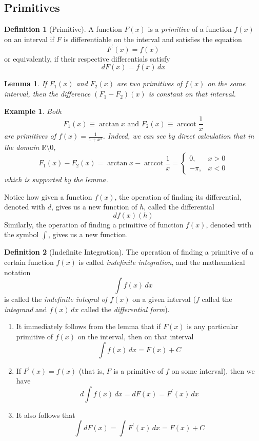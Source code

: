 \documentclass{article}
\DeclareMathOperator{\arccot}{arccot}
\newtheorem{lemma}[theorem]{Lemma}
\newtheorem{example}{Example}[section]
\theoremstyle{remark}
\theoremstyle{definition}
\newtheorem{definition}{Definition}[section]
\begin{document}
\subsection{Primitives}
\begin{definition}[Primitive]
A function $F(x)$ is a \textit{primitive} of a function $f(x)$ on an interval if $F$ is differentiable on the interval and satisfies the equation 
\[F^\prime (x) = f(x)\]
or equivalently, if their respective differentials satisfy
\[d F(x) = f(x) \,dx\]
\end{definition}

\begin{lemma}
If $F_1(x)$ and $F_2 (x)$ are two primitives of $f(x)$ on the same interval, then the difference $(F_1 - F_2)(x)$ is constant on that interval. 
\end{lemma}

\begin{example}
Both 
\[F_1(x) \equiv \arctan{x} \text{ and } F_2(x) \equiv \arccot{\frac{1}{x}}\]
are primitives of $f(x) = \frac{1}{1 + x^2}$. Indeed, we can see by direct calculation that in the domain $\mathbb{R} \setminus 0$, 
\[F_1 (x) - F_2 (x) = \arctan{x} - \arccot{\frac{1}{x}} = \begin{cases}
0, & x > 0 \\
-\pi, & x < 0
\end{cases}\]
which is supported by the lemma. 
\end{example}

Notice how given a function $f(x)$, the operation of finding its differential, denoted with $d$, gives us a new function of $h$, called the differential 
\[df(x)(h)\]
Similarly, the operation of finding a primitive of function $f(x)$, denoted with the symbol $\int$, gives us a new function. 

\begin{definition}[Indefinite Integration]
The operation of finding a primitive of a certain function $f(x)$ is called \textit{indefinite integration}, and the mathematical notation 
\[\int f(x) \,dx\]
is called the \textit{indefinite integral of $f(x)$} on a given interval ($f$ called the \textit{integrand} and $f(x)\,dx$ called the \textit{differential form}). 
\begin{enumerate}
    \item It immediately follows from the lemma that if $F(x)$ is any particular primitive of $f(x)$ on the interval, then on that interval 
    \[\int f(x) \,dx = F(x) + C\]
    \item If $F^\prime (x) = f(x)$ (that is, $F$ is a primitive of $f$ on some interval), then we have
    \[d \int f(x)\,dx = d F(x) = F^\prime (x) \,dx \]
    \item It also follows that 
    \[\int d F(x) = \int F^\prime (x)\,dx = F(x) + C\]
\end{enumerate}
\end{definition}
\end{document}
